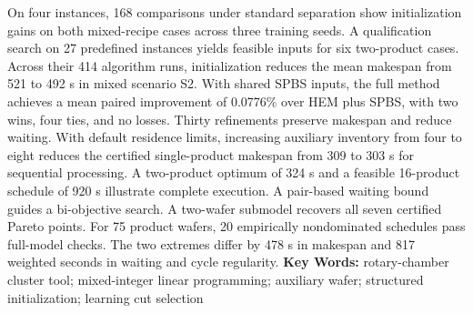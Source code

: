 On four instances, 168 comparisons under standard separation show initialization gains on both mixed-recipe cases across three training seeds. A qualification search on 27 predefined instances yields feasible inputs for six two-product cases. Across their 414 algorithm runs, initialization reduces the mean makespan from 521 to 492 s in mixed scenario S2. With shared SPBS inputs, the full method achieves a mean paired improvement of 0.0776\% over HEM plus SPBS, with two wins, four ties, and no losses. Thirty refinements preserve makespan and reduce waiting. With default residence limits, increasing auxiliary inventory from four to eight reduces the certified single-product makespan from 309 to 303 s for sequential processing. A two-product optimum of 324 s and a feasible 16-product schedule of 920 s illustrate complete execution. A pair-based waiting bound guides a bi-objective search. A two-wafer submodel recovers all seven certified Pareto points. For 75 product wafers, 20 empirically nondominated schedules pass full-model checks. The two extremes differ by 478 s in makespan and 817 weighted seconds in waiting and cycle regularity.
\vfill
\noindent\textbf{Key Words: }rotary-chamber cluster tool; mixed-integer linear programming; auxiliary wafer; structured initialization; learning cut selection\clearpage
